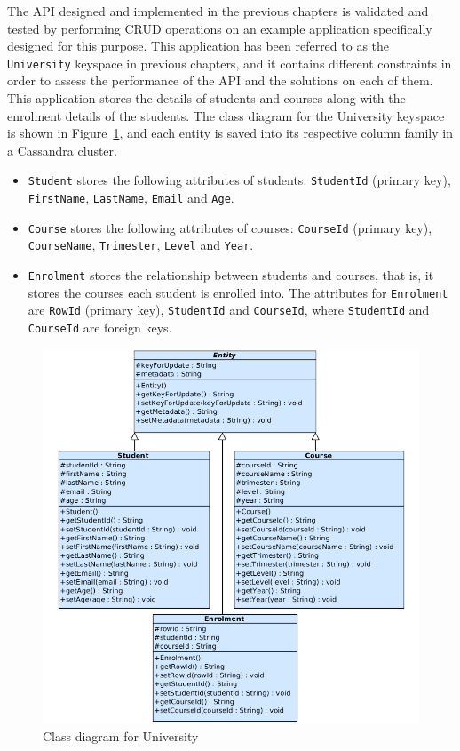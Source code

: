 The  \ac{API} designed and implemented in the previous chapters is validated and
tested by performing \ac{CRUD} operations on an example application
specifically designed for this purpose.  This application has been referred to
as the \texttt{University} keyspace in previous chapters,  and it contains
different constraints in order to  assess the performance of the \ac{API} and
the solutions on each of them.  This application stores the details of students and
 courses along with the enrolment details of the students.  The class diagram for
 the University keyspace is shown in Figure~\ref{fexp:ClassDiagram},  and each
 entity is saved into its respective column family in a Cassandra cluster. 

	\begin{itemize}
	  \item \texttt{Student} stores the  following attributes of students:
	   \texttt{StudentId} (primary key),  \texttt{FirstName},  \texttt{LastName}, 
	  \texttt{Email} and \texttt{Age}. 
	  \item \texttt{Course} stores  the following  attributes of courses:
	  \texttt{CourseId} (primary key),  \texttt{CourseName},  \texttt{Trimester}, 
	  \texttt{Level} and \texttt{Year}. 
	  \item \texttt{Enrolment} stores the  relationship between
	  students and courses,  that is,  it stores the courses each student is enrolled
	  into.   The attributes for \texttt{Enrolment} are \texttt{RowId} (primary
	  key),  \texttt{StudentId} and \texttt{CourseId},  where \texttt{StudentId}
	  and \texttt{CourseId} are foreign keys. 
	\end{itemize}
	
	\begin{figure}[h] 
		\centering
		\includegraphics[width=1\textwidth]{./figure/uml/example.png}
		\caption{Class diagram for University}\label{fexp:ClassDiagram}
	\end{figure} 

